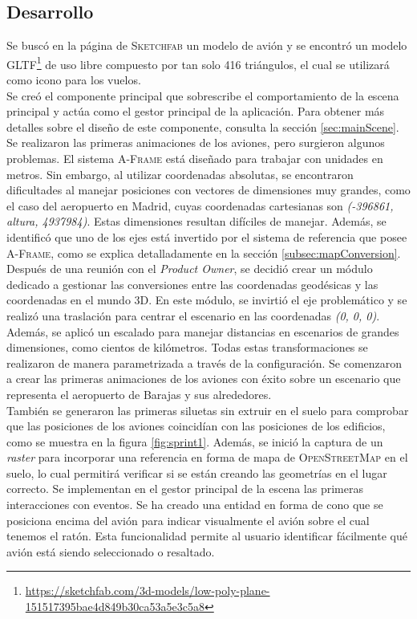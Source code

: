 \documentclass[a4paper, 11pt]{book}
\begin{document}
\subsection{Desarrollo}
Se buscó en la página de \textsc{Sketchfab} un modelo de avión y se encontró un modelo \textsc{GLTF}\footnote{\url{https://sketchfab.com/3d-models/low-poly-plane-151517395bae4d849b30ca53a5e3c5a8}} de uso libre compuesto por tan solo 416 triángulos, el cual se utilizará como icono para los vuelos.\\
Se creó el componente principal que sobrescribe el comportamiento de la escena principal y actúa como el gestor principal de la aplicación. Para obtener más detalles sobre el diseño de este componente, consulta la sección \ref{sec:mainScene}.
Se realizaron las primeras animaciones de los aviones, pero surgieron algunos problemas. El sistema \textsc{A-Frame} está diseñado para trabajar con unidades en metros. Sin embargo, al utilizar coordenadas absolutas, se encontraron dificultades al manejar posiciones con vectores de dimensiones muy grandes, como el caso del aeropuerto en Madrid, cuyas coordenadas cartesianas son \emph{(-396861, altura, 4937984)}. Estas dimensiones resultan difíciles de manejar. Además, se identificó que uno de los ejes está invertido por el sistema de referencia que posee \textsc{A-Frame}, como se explica detalladamente en la sección \ref{subsec:mapConversion}.\\
Después de una reunión con el \emph{Product Owner}, se decidió crear un módulo dedicado a gestionar las conversiones entre las coordenadas geodésicas y las coordenadas en el mundo \textsc{3D}. En este módulo, se invirtió el eje problemático y se realizó una traslación para centrar el escenario en las coordenadas \emph{(0, 0, 0)}. Además, se aplicó un escalado para manejar distancias en escenarios de grandes dimensiones, como cientos de kilómetros. Todas estas transformaciones se realizaron de manera parametrizada a través de la configuración.
Se comenzaron a crear las primeras animaciones de los aviones con éxito sobre un escenario que representa el aeropuerto de Barajas y sus alrededores. \\
También se generaron las primeras siluetas sin extruir en el suelo para comprobar que las posiciones de los aviones coincidían con las posiciones de los edificios, como se muestra en la figura \ref{fig:sprint1}.
Además, se inició la captura de un \emph{raster} para incorporar una referencia en forma de mapa de \textsc{OpenStreetMap} en el suelo, lo cual permitirá verificar si se están creando las geometrías en el lugar correcto.
Se implementan en el gestor principal de la escena las primeras interacciones con eventos. Se ha creado una entidad en forma de cono que se posiciona encima del avión para indicar visualmente el avión sobre el cual tenemos el ratón. Esta funcionalidad permite al usuario identificar fácilmente qué avión está siendo seleccionado o resaltado.
\end{document}
